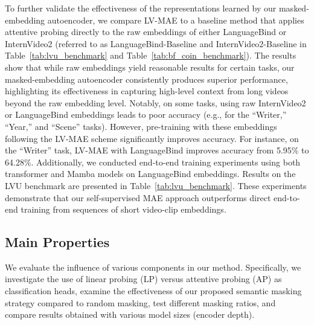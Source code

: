 To further validate the effectiveness of the representations learned by our masked-embedding autoencoder, we compare LV-MAE to a baseline method that applies attentive probing directly to the raw embeddings of either LanguageBind or InternVideo2 (referred to as LanguageBind-Baseline and InternVideo2-Baseline in Table~\ref{tab:lvu_benchmark} and Table~\ref{tab:bf_coin_benchmark}). The results show that while raw embeddings yield reasonable results for certain tasks, our masked-embedding autoencoder consistently produces superior performance, highlighting its effectiveness in capturing high-level context from long videos beyond the raw embedding level.
Notably, on some tasks, using raw InternVideo2 or LanguageBind embeddings leads to poor accuracy (e.g., for the “Writer,” “Year,” and “Scene” tasks). However, pre-training with these embeddings following the LV-MAE scheme significantly improves accuracy. For instance, on the “Writer” task, LV-MAE with LanguageBind improves accuracy from 5.95\% to 64.28\%. Additionally, we conducted end-to-end training experiments using both transformer and Mamba models on LanguageBind embeddings. Results on the LVU benchmark are presented in Table~\ref{tab:lvu_benchmark}. These experiments demonstrate that our self-supervised MAE approach outperforms direct end-to-end training from sequences of short video-clip embeddings.


\subsection{Main Properties} 
We evaluate the influence of various components in our method. Specifically, we investigate the use of linear probing (LP) versus attentive probing (AP) as classification heads, examine the effectiveness of our proposed semantic masking strategy compared to random masking, test different masking ratios, and compare results obtained with various model sizes (encoder depth).
\vspace{-1em}



